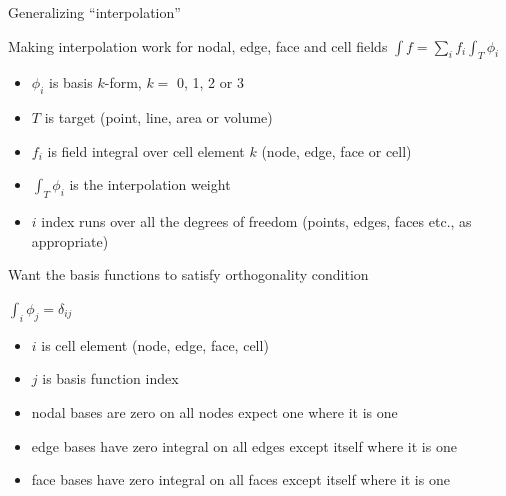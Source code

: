 \documentclass[aspectratio=169]{beamer}
\begin{document}
\begin{frame}[fragile]{Generalizing ``interpolation''}
\begin{block}{Making interpolation work for nodal, edge, face and cell fields}
$\int f = \sum_i f_i \int_T \phi_i$
\begin{itemize}
\item $\phi_i$ is basis $k$-form, $k =$ 0, 1, 2 or 3
\item $T$ is target (point, line, area or volume)
\item $f_i$ is field integral over cell element $k$ (node, edge, face or cell)
\item $\int_T \phi_i$ is the interpolation weight
\item $i$ index runs over all the degrees of freedom (points, edges, faces etc., as appropriate)
\end{itemize}
\end{block}
\end{frame}

\begin{frame}[fragile]{Want the basis functions to satisfy orthogonality condition}

\begin{block}{$\int_i \phi_j = \delta_{ij}$}
 \begin{itemize}
   \item $i$ is cell element (node, edge, face, cell)
   \item $j$ is basis function index
   \item nodal bases are zero on all nodes expect one where it is one
   \item edge bases have zero integral on all edges except itself where it is one
   \item face bases have zero integral on all faces except itself where it is one
 \end{itemize}
 \end{block}

\end{frame}
\end{document}
